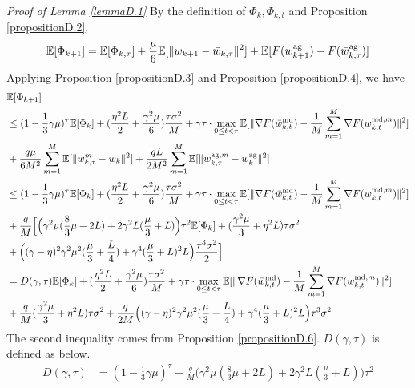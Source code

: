 \documentclass[11pt]{article}
\begin{document}
\emph{Proof of Lemma \ref{lemmaD.1}} \textrm{ } By the definition of $\Phi_k, \Phi_{k, t}$ and Proposition \ref{propositionD.2},
\begin{gather*}
    \mathbb{E}[\Phi_{k+1}] = \mathbb{E}[\Phi_{k, \tau}] + \frac{\mu}{6}\mathbb{E}[\|w_{k+1} - \Bar{w}_{k, \tau}\|^2] + \mathbb{E}[F(w_{k+1}^{\textrm{ag}}) - F(\Bar{w}_{k, \tau}^{\textrm{ag}})]
\end{gather*}
Applying Proposition \ref{propositionD.3} and Proposition \ref{propositionD.4}, we have
\begin{align*}
    &\mathbb{E}[\Phi_{k+1}] \\
    &\leq (1-\frac{1}{3}\gamma\mu)^\tau \mathbb{E}[\Phi_k] + (\frac{\eta^2 L}{2} + \frac{\gamma^2\mu}{6})\frac{\tau\sigma^2}{M} + \gamma\tau \cdot \max_{0\leq t <\tau} \mathbb{E}[\|\nabla F(\Bar{w}_{k, t}^{\textrm{md}}) - \frac{1}{M} \sum_{m=1}^M \nabla F(w_{k, t}^{\textrm{md}, m})\|^2] \\
    &+ \frac{q\mu}{6M^2}\sum_{m=1}^M \mathbb{E}[\|w_{k, \tau}^m - w_k\|^2] + \frac{qL}{2M^2} \sum_{m=1}^M \mathbb{E}[\|w_{k, \tau}^{\textrm{ag}, m} - w_k^{\textrm{ag}}\|^2] \\
    &\leq (1-\frac{1}{3}\gamma\mu)^\tau \mathbb{E}[\Phi_k] + (\frac{\eta^2 L}{2} + \frac{\gamma^2\mu}{6})\frac{\tau\sigma^2}{M} + \gamma\tau \cdot \max_{0\leq t <\tau} \mathbb{E}[\|\nabla F(\Bar{w}_{k, t}^{\textrm{md}}) - \frac{1}{M} \sum_{m=1}^M \nabla F(w_{k, t}^{\textrm{md}, m})\|^2] \\
    &+ \frac{q}{M}\Big[ \Big( \gamma^2\mu(\frac{8}{3}\mu + 2L) + 2\gamma^2L(\frac{\mu}{3}+L)\Big)\tau^2 \mathbb{E}[\Phi_k] + (\frac{\gamma^2\mu}{3}+\eta^2 L)\tau\sigma^2 \\
    &+ \Big( (\gamma-\eta)^2\gamma^2\mu^2(\frac{\mu}{3}+\frac{L}{4})+\gamma^4(\frac{\mu}{3}+L)^2 L \Big) \frac{\tau^3\sigma^2}{2}\Big] \\
    &= D(\gamma, \tau) \mathbb{E}[\Phi_k] + (\frac{\eta^2 L}{2} + \frac{\gamma^2\mu}{6})\frac{\tau\sigma^2}{M} + \gamma\tau \cdot \max_{0\leq t <\tau} \mathbb{E}[\|\nabla F(\Bar{w}_{k, t}^{\textrm{md}}) - \frac{1}{M} \sum_{m=1}^M \nabla F(w_{k, t}^{\textrm{md}, m})\|^2]\\
    &+ \frac{q}{M}(\frac{\gamma^2\mu}{3}+\eta^2 L)\tau\sigma^2 + \frac{q}{2M}\Big( (\gamma-\eta)^2 \gamma^2\mu^2 (\frac{\mu}{3} + \frac{L}{4}) + \gamma^4 (\frac{\mu}{3} + L)^2 L \Big)\tau^3\sigma^2
\end{align*}
The second inequality comes from Proposition \ref{propositionD.6}. $D(\gamma, \tau)$ is defined as below.
\begin{align*}
    D(\gamma, \tau) &= (1-\frac{1}{3}\gamma\mu)^\tau + \frac{q}{M}\Big( \gamma^2\mu(\frac{8}{3}\mu + 2L) + 2\gamma^2 L(\frac{\mu}{3} + L)\Big)\tau^2
\end{align*}
\end{document}
